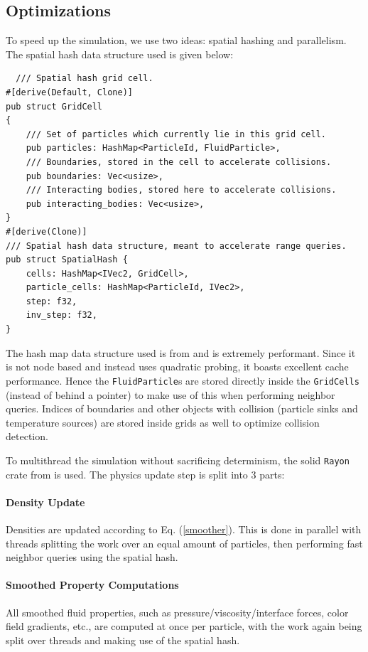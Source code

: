 \documentclass[acmtog,review]{acmart}
\begin{document}
\subsection{Optimizations}
To speed up the simulation, we use two ideas: spatial hashing and parallelism. The spatial hash data structure used is given below: 
\begin{verbatim}
  /// Spatial hash grid cell.
#[derive(Default, Clone)]
pub struct GridCell
{
    /// Set of particles which currently lie in this grid cell.
    pub particles: HashMap<ParticleId, FluidParticle>,
    /// Boundaries, stored in the cell to accelerate collisions. 
    pub boundaries: Vec<usize>,
    /// Interacting bodies, stored here to accelerate collisions.
    pub interacting_bodies: Vec<usize>, 
}
#[derive(Clone)]
/// Spatial hash data structure, meant to accelerate range queries. 
pub struct SpatialHash {
    cells: HashMap<IVec2, GridCell>,
    particle_cells: HashMap<ParticleId, IVec2>,
    step: f32,
    inv_step: f32,
}
\end{verbatim}
The hash map data structure used is from \cite{Hashbrown} and is extremely performant. Since it is not node based and instead uses quadratic probing, it boasts excellent cache performance. Hence the \texttt{FluidParticle}s are stored directly inside the \texttt{GridCells} (instead of behind a pointer) to make use of this when performing neighbor queries. Indices of boundaries and other objects with collision (particle sinks and temperature sources) are stored inside grids as well to optimize collision detection. 

To multithread the simulation without sacrificing determinism, the solid \texttt{Rayon} crate from \cite{Rayon} is used. The physics update step is split into 3 parts:
\paragraph*{Density Update} Densities are updated according to Eq. (\ref{smoother}). This is done in parallel with threads splitting the work over an equal amount of particles, then performing fast neighbor queries using the spatial hash.
\paragraph*{Smoothed Property Computations} All smoothed fluid properties, such as pressure/viscosity/interface forces, color field gradients, etc., are computed at once per particle, with the work again being split over threads and making use of the spatial hash.
\end{document}
